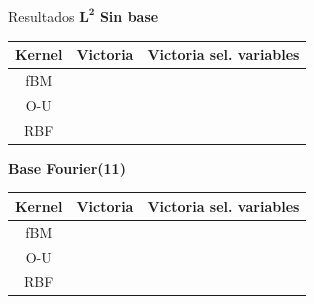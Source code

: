 \documentclass[10pt, spanish, professionalfonts]{beamer}
\newcommand{\cmark}{\ding{51}}%
\newcommand{\xmark}{\ding{55}}%
\begin{document}
\begin{frame}{Resultados \(\boldsymbol{L^2}\)}
\textbf{Sin base}
  \begin{table}
    \begin{tabular}{c|cc}
      Kernel & Victoria & Victoria sel. variables \\ \hline
      fBM & \xmark & \xmark\\
      O-U & \xmark & \xmark\\
      RBF & \xmark & \xmark
    \end{tabular}
  \end{table}
\textbf{Base Fourier(11)}
  \begin{table}
    \begin{tabular}{c|cc}
      Kernel & Victoria & Victoria sel. variables \\ \hline
      fBM & \cmark &  \cmark\\
      O-U & \cmark & \cmark\\
      RBF & \xmark & \xmark
    \end{tabular}
  \end{table}
\end{frame}
\end{document}
